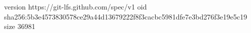 version https://git-lfs.github.com/spec/v1
oid sha256:5b3e4573830578ce29a44d13679222f8f3cacbc5981dfe7e3bd276f3e19e5c19
size 36981
